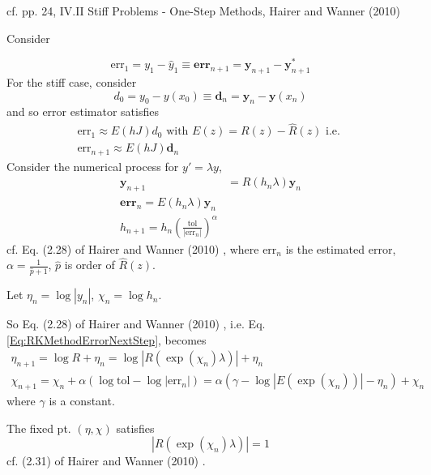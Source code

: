 \documentclass[10pt]{amsart}
\begin{document}
\begin{multicols*}{2}
cf. pp. 24, IV.II Stiff Problems - One-Step Methods, Hairer and Wanner (2010) \cite{HaWa2010}

Consider 

\begin{equation}
	\text{err}_1 = y_1  - \widehat{y}_1 \equiv \textbf{err}_{n+1} = \mathbf{y}_{n+1} - \mathbf{y}^*_{n+1}
\end{equation}
For the stiff case, consider
\begin{equation}
	d_0 = y_0 - y(x_0) \equiv \mathbf{d}_n = \mathbf{y}_n - \mathbf{y}(x_n)
\end{equation}
and so error estimator satisfies
\[
\begin{gathered}
	\text{err}_1 \approx E(hJ) d_0 \text{ with } E(z) = R(z) - \widehat{R}(z) \text{ i.e. } \\
	\text{err}_{n+1} \approx E(hJ) \mathbf{d}_n
\end{gathered}
\]
Consider the numerical process for $y' = \lambda y$,
\begin{equation}\label{Eq:RKMethodErrorNextStep}
	\begin{aligned}
		\mathbf{y}_{n+1} &= R(h_n \lambda) \mathbf{y}_n \\
		\textbf{err}_n = E(h_n \lambda) \mathbf{y}_n \\
		h_{n+1} = h_n \left( \frac{\text{tol}}{ |\text{err}_n | } \right)^{\alpha}
	\end{aligned}
\end{equation}
cf. Eq. (2.28) of Hairer and Wanner (2010) \cite{HaWa2010}, where $\text{err}_{n}$ is the estimated error, $\alpha = \frac{1}{ \widehat{p} + 1}$, $\widehat{p}$ is order of $\widehat{R}(z)$.

Let $\eta_n = \log{ |y_n| }$, $\chi_n = \log{h_n}$.

So Eq. (2.28) of Hairer and Wanner (2010) \cite{HaWa2010}, i.e. Eq. \ref{Eq:RKMethodErrorNextStep}, becomes
\begin{equation}\label{Eq:RKMethodErrorNextStepAsLogs}
	\begin{gathered}
		\eta_{n+1} = \log{R} + \eta_n = \log{ |R(\exp{(\chi_n)} \lambda)|} + \eta_n \\
		\chi_{n+1} = \chi_n + \alpha \left( \log{\text{tol}} - \log{|\text{err}_n|} \right) = \alpha (\gamma -\log{|E(\exp{(\chi_n)})|} - \eta_n) + \chi_n
	\end{gathered}
\end{equation}
where $\gamma$ is a constant.

The fixed pt. $(\eta, \chi)$ satisfies 
\begin{equation}
	|R(\exp{(\chi_n)} \lambda)| =1
\end{equation}
cf. (2.31) of Hairer and Wanner (2010) \cite{HaWa2010}.


\end{multicols*}
\end{document}
